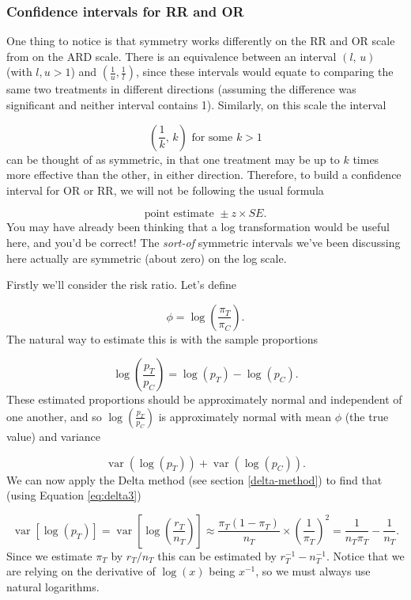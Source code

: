 \documentclass[
  openany]{book}
\theoremstyle{definition}
\theoremstyle{definition}
\theoremstyle{definition}
\theoremstyle{definition}
\theoremstyle{remark}
\begin{document}
\hypertarget{confidence-intervals-for-rr-and-or}{%
\subsubsection{Confidence intervals for RR and OR}\label{confidence-intervals-for-rr-and-or}}

One thing to notice is that symmetry works differently on the RR and OR scale from on the ARD scale. There is an equivalence between an interval \(\left(l,\,u\right)\) (with \(l,u>1\)) and \(\left(\frac{1}{u},\frac{1}{l}\right)\), since these intervals would equate to comparing the same two treatments in different directions (assuming the difference was significant and neither interval contains 1). Similarly, on this scale the interval

\[\left(\frac{1}{k},\,k\right) \text{ for some }k>1 \]
can be thought of as symmetric, in that one treatment may be up to \(k\) times more effective than the other, in either direction. Therefore, to build a confidence interval for OR or RR, we will not be following the usual formula

\[\text{point estimate } \pm{z\times{SE}}.\]
You may have already been thinking that a log transformation would be useful here, and you'd be correct! The \emph{sort-of} symmetric intervals we've been discussing here actually are symmetric (about zero) on the log scale.

Firstly we'll consider the risk ratio. Let's define

\[ \phi = \log\left(\frac{\pi_T}{\pi_C}\right).\]
The natural way to estimate this is with the sample proportions

\[\log\left(\frac{p_T}{p_C}\right) = \log\left(p_T\right) - \log\left(p_C\right).\]
These estimated proportions should be approximately normal and independent of one another, and so \(\log\left(\frac{p_T}{p_C}\right)\) is approximately normal with mean \(\phi\) (the true value) and variance

\[\operatorname{var}\left(\log\left(p_T\right)\right) + \operatorname{var}\left(\log\left(p_C\right)\right). \]
We can now apply the Delta method (see section \ref{delta-method}) to find that (using Equation \eqref{eq:delta3})

\[\operatorname{var}\left[\log\left(p_T\right)\right] = \operatorname{var}\left[\log\left(\frac{r_T}{n_T}\right)\right] \approx \frac{\pi_T\left(1-\pi_T\right)}{n_T}\times{\left(\frac{1}{\pi_T}\right)^2} = \frac{1}{n_T\pi_T} - \frac{1}{n_T}. \]
Since we estimate \(\pi_T\) by \(r_T/n_T\) this can be estimated by \(r_T^{-1} - n_T^{-1}\). Notice that we are relying on the derivative of \(\log\left(x\right)\) being \(x^{-1}\), so we must always use natural logarithms.
\end{document}
